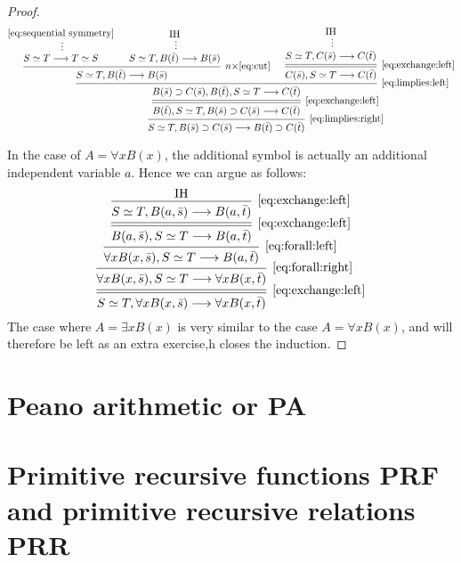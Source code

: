 \documentclass[11pt,a4paper]{article}
\begin{document}
\begin{proof}
    \begin{equation*}
        \begin{prooftree}
            \hypo{\eqref{eq:sequential symmetry}}
            \ellipsis{}{S\simeq T\seq T\simeq S}
            \hypo{\IH}
            \ellipsis{}{S\simeq T, B(\bar t)\seq B(\bar s)}
            \infer2[\(n\times\)\eqref{eq:cut}]{S\simeq T,B(\bar t)\seq B(\bar s)}
            \hypo{\IH}
            \ellipsis{}{S\simeq T,C(\bar s)\seq C(\bar t)}
            \infer[double]1[\eqref{eq:exchange:left}]{C(\bar s), S\simeq T\seq C(\bar t)}
            \infer2[\eqref{eq:limplies:left}]{B(\bar s)\limplies C(\bar s), B(\bar t),S\simeq T\seq C(\bar t)}
            \infer[double]1[\eqref{eq:exchange:left}]{B(\bar t),S\simeq T, B(\bar s)\limplies C(\bar s)\seq C(\bar t)}
            \infer1[\eqref{eq:limplies:right}]{S\simeq T, B(\bar s)\limplies C(\bar s)\seq B(\bar t)\limplies C(\bar t)}
        \end{prooftree}
    \end{equation*}

    In the case of \(A = \forall xB(x)\),
    the additional symbol is actually an additional
    independent variable \(a\). Hence we can argue as follows:
    \begin{equation*}
        \begin{prooftree}
            \hypo{\IH}
            \infer1[\eqref{eq:exchange:left}]{S\simeq T,B(a,\bar s)\seq B(a,\bar t)}
            \infer[double]1[\eqref{eq:exchange:left}]{B(a,\bar s),S\simeq T\seq B(a,\bar t)}
            \infer1[\eqref{eq:forall:left}]{\forall xB(x,\bar s),S\simeq T\seq B(a,\bar t)}
            \infer1[\eqref{eq:forall:right}]{\forall xB(x,\bar s),S\simeq T\seq\forall xB(x,\bar t)}
            \infer[double]1[\eqref{eq:exchange:left}]{S\simeq T, \forall xB(x,\bar s)\seq\forall xB(x,\bar t)}
        \end{prooftree}
    \end{equation*}
    The case where \(A = \exists xB(x)\) is very similar to the case \(A = \forall xB(x)\),
    and will therefore be left as an extra exercise,h closes the induction.
\end{proof}


\section{Peano arithmetic or PA}

\section{Primitive recursive functions PRF and primitive recursive relations PRR}
\end{document}
